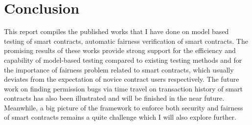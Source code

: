 \chapter{Conclusion} %
\label{ch:conclusion} %

This report compiles the published works that I have done on model based testing of smart contracts, automatic fairness verification of smart contracts.
The promising results of these works provide strong support for the efficiency and capability of model-based testing compared to existing testing methods 
and for the importance of fairness problem related to smart contracts, which usually deviates from the expectation of novice contract users respectively.
The future work on finding permission bugs via time travel on transaction history of smart contracts has also been illustrated and will be finished in the near future.
Meanwhile, a big picture of the framework to enforce both security and fairness of smart contracts remains a quite challenge which I will also explore further.